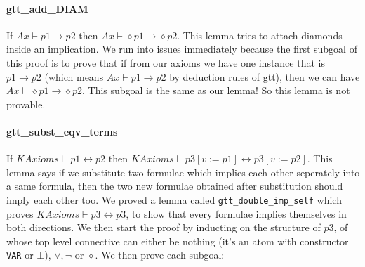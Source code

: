 \documentclass[submission,copyright,creativecommons]{eptcs}
\begin{document}
\paragraph{gtt\_add\_DIAM} If $Ax \vdash p1 \rightarrow p2$ then $Ax \vdash \diamond p1 \rightarrow \diamond p2$.
This lemma tries to attach diamonds inside an implication. 
We run into issues immediately because the first subgoal of this 
proof is to prove that if from our axioms we have one instance that 
is $p1 \rightarrow p2$ (which means $Ax \vdash p1 \rightarrow p2$ by 
deduction rules of gtt), then we can have $Ax \vdash \diamond p1 \rightarrow \diamond p2$.
This subgoal is the same as our lemma! So this lemma is not provable. 

\paragraph{gtt\_subst\_eqv\_terms} If $KAxioms \vdash p1 \leftrightarrow p2$ 
then $KAxioms \vdash p3[v:=p1] \leftrightarrow p3[v:=p2]$. This 
lemma says if we substitute two formulae which implies each other seperately 
into a same formula, then the two new formulae obtained after substitution 
should imply each other too. We proved a lemma called \texttt{gtt\_double\_imp\_self} 
which proves $KAxioms \vdash p3 \leftrightarrow p3$, to show that 
every formulae implies themselves in both directions. We then start the 
proof by inducting on the structure of $p3$, of whose top level 
connective can either be nothing (it's an atom with constructor \texttt{VAR}
or $\bot$), $\vee, \neg$ or $\diamond$. We then prove each subgoal:
\end{document}
